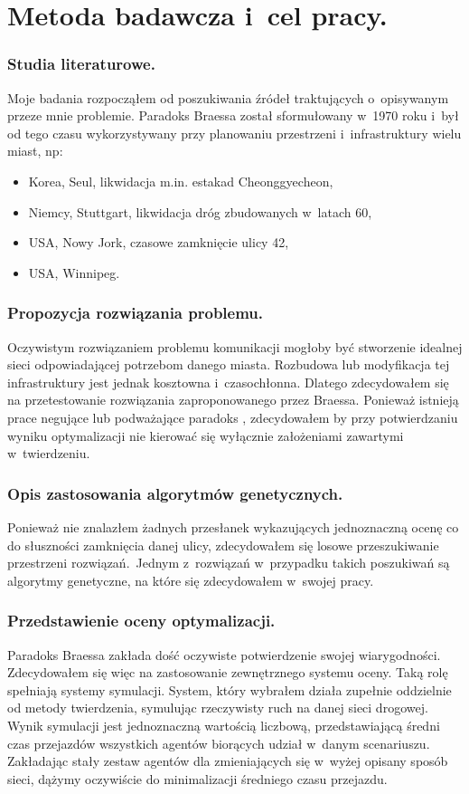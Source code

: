 \documentclass[twoside,12pt]{report}
\begin{document}
\section{Metoda badawcza i~cel pracy.}
\subsubsection{Studia literaturowe.}
Moje badania rozpocząłem od poszukiwania źródeł traktujących o~opisywanym przeze mnie problemie. Paradoks Braessa został sformułowany w~1970 roku i~był od tego czasu wykorzystywany przy planowaniu przestrzeni i~infrastruktury wielu miast, np:

\begin{itemize}
\item Korea, Seul, likwidacja m.in. estakad Cheonggyecheon,
\item Niemcy, Stuttgart, likwidacja dróg zbudowanych w~latach 60,
\item USA, Nowy Jork, czasowe zamknięcie ulicy 42,
\item USA, Winnipeg.\cite{urban}
\end{itemize}  

\subsubsection{Propozycja rozwiązania problemu.}
Oczywistym rozwiązaniem problemu komunikacji mogłoby być stworzenie idealnej sieci odpowiadającej potrzebom danego miasta. Rozbudowa lub modyfikacja tej infrastruktury jest jednak kosztowna i~czasochłonna. Dlatego zdecydowałem się na przetestowanie rozwiązania zaproponowanego przez Braessa. Ponieważ istnieją prace negujące lub podważające paradoks\cite{newinsights} , zdecydowałem by przy potwierdzaniu wyniku optymalizacji nie kierować się wyłącznie założeniami zawartymi w~twierdzeniu.

\subsubsection{Opis zastosowania algorytmów genetycznych.}
Ponieważ nie znalazłem żadnych przesłanek wykazujących jednoznaczną ocenę co do słuszności zamknięcia danej ulicy, zdecydowałem się losowe przeszukiwanie przestrzeni rozwiązań.~Jednym z~rozwiązań w~przypadku takich poszukiwań są algorytmy genetyczne, na które się zdecydowałem w~swojej pracy.

\subsubsection{Przedstawienie oceny optymalizacji.}
Paradoks Braessa zakłada dość oczywiste potwierdzenie swojej wiarygodności. Zdecydowałem się więc na zastosowanie zewnętrznego systemu oceny. Taką rolę spełniają systemy symulacji. System, który wybrałem działa zupełnie oddzielnie od metody twierdzenia, symulując rzeczywisty ruch na danej sieci drogowej. Wynik symulacji jest jednoznaczną wartością liczbową, przedstawiającą średni czas przejazdów wszystkich agentów biorących udział w~danym scenariuszu. Zakładając stały zestaw agentów dla zmieniających się w~wyżej opisany sposób sieci, dążymy oczywiście do minimalizacji średniego czasu przejazdu.
\end{document}
